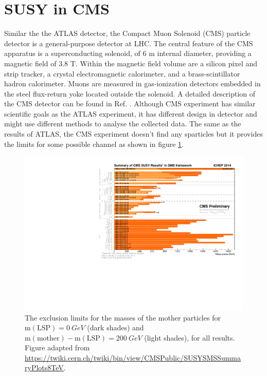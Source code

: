 \documentclass[12pt]{report}
\begin{document}
\section{SUSY in CMS}
Similar the the ATLAS detector, the Compact Muon Solenoid (CMS) particle detector is a general-purpose detector at LHC.
The central feature of the CMS apparatus is a superconducting solenoid, of 6 m internal diameter, providing a magnetic field of 3.8 T.
Within the magnetic field volume are a silicon pixel and strip tracker, a crystal electromagnetic calorimeter, and a brass-scintillator hadron calorimeter.
Muons are measured in gas-ionization detectors embedded in the steel flux-return yoke located outside the solenoid.
A detailed description of the CMS detector can be found in Ref. \cite{cms detector}.
Although CMS experiment has similar scientific goals as the ATLAS experiment, it has different design in detector and might use different methods to analyse the collected data.
The same as the results of ATLAS, the CMS experiment doesn't find any sparticles but it provides the limits for some possible channel as shown in figure \ref{fig: barplot_ICHEP2014}.
\begin{figure}[htbp]
\begin{center}
\includegraphics[scale=0.8]{figures/barplot_ICHEP2014.pdf}
\caption{The exclusion limits for the masses of the mother particles for $\mathrm{m(LSP)} = 0 \ GeV$ (dark shades) and $\mathrm{m(mother)} - \mathrm{m(LSP)} = 200 \ GeV$ (light shades), for all results. Figure adapted from \url{https://twiki.cern.ch/twiki/bin/view/CMSPublic/SUSYSMSSummaryPlots8TeV}.}
\label{fig: barplot_ICHEP2014}
\end{center}
\end{figure}
\end{document}
